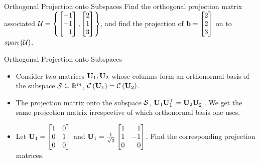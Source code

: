 \documentclass[aspectratio=169]{beamer}
\let\olditem\item
\renewcommand{\item}{\setlength{\itemsep}{\fill}\olditem}
\def\mf{\ensuremath\mathbf}
\def\mb{\ensuremath\mathbb}
\def\mc{\ensuremath\mathcal}
\def\lp{\ensuremath\left(}
\def\rp{\ensuremath\right)}
\def\bmx{\ensuremath\begin{bmatrix*}[r]}
\def\emx{\ensuremath\end{bmatrix*}}
\begin{document}
\begin{frame}[t]{Orthogonal Projection onto Subspaces}
Find the orthogonal projection matrix associated $\mc{U} = \left\{\begin{bmatrix*}[r]-1\\-1\\1\end{bmatrix*}, \begin{bmatrix*}[r]2\\1\\3\end{bmatrix*}\right\}$, and find the projection of $\mf{b} = \begin{bmatrix*}[r]2\\2\\3\end{bmatrix*}$ on to $span \lp \mc{U}\rp$.
\end{frame}


\begin{frame}[t]{Orthogonal Projection onto Subspaces}

\begin{itemize}
    \item Consider two matrices $\mf{U}_1, \mf{U}_2$ whose columns form an  orthonormal basis of the subspace $\mc{S} \subseteq \mb{R}^m $, $\mc{C}\lp\mf{U}_1\rp = \mc{C}\lp\mf{U}_2\rp$.

    \item The projection matrix onto the subspace $\mc{S}$, $\mf{U}_1\mf{U}_1^\top = \mf{U}_2\mf{U}_2^\top$. We get the same projection matrix irrespective of which orthonormal basis one uses.
    
    \item {\color{blue} Let $\mf{U}_1 = \bmx1 & 0\\0 & 1\\0 & 0\emx$ and $\mf{U}_1 = \frac{1}{\sqrt{2}}\bmx1 & 1\\1 & -1\\0 & 0\emx$. Find the corresponding projection matrices.}
\end{itemize}
\end{frame}
\end{document}
